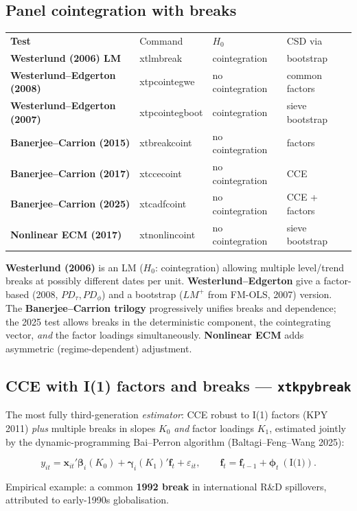 \documentclass[11pt,a4paper]{article}
\newcommand{\Ito}{I(1)}
\newcommand{\cmd}[1]{\texttt{\textcolor{camber}{#1}}}
\newcommand{\hlt}[2]{\textcolor{#1}{\textbf{#2}}}
\newcommand{\bbeta}{\boldsymbol{\beta}}
\newcommand{\bgamma}{\boldsymbol{\gamma}}
\newcommand{\bx}{\mathbf{x}}
\newcommand{\bff}{\mathbf{f}}
\newcommand{\bphi}{\boldsymbol{\phi}}
\theoremstyle{definition}
\begin{document}
\subsection{Panel cointegration with breaks}
\begin{center}
\begin{tabular}{@{}>{\bfseries}l >{\ttfamily}l l l@{}}
\rowcolor{cblue}\color{white}Test & \color{white}Command & \color{white}$H_0$ & \color{white}CSD via\\
Westerlund (2006) LM & xtlmbreak & cointegration & bootstrap\\
Westerlund--Edgerton (2008) & xtpcointegwe & no cointegration & common factors\\
Westerlund--Edgerton (2007) & xtpcointegboot & cointegration & sieve bootstrap\\
Banerjee--Carrion (2015) & xtbreakcoint & no cointegration & factors\\
Banerjee--Carrion (2017) & xtccecoint & no cointegration & CCE\\
Banerjee--Carrion (2025) & xtcadfcoint & no cointegration & CCE + factors\\
Nonlinear ECM (2017) & xtnonlincoint & no cointegration & sieve bootstrap\\
\end{tabular}
\end{center}
\textbf{Westerlund (2006)} is an LM ($H_0$: cointegration) allowing multiple level/trend breaks at
possibly different dates per unit. \textbf{Westerlund--Edgerton} give a factor-based (2008,
$PD_\tau,PD_\phi$) and a bootstrap ($LM^+$ from FM-OLS, 2007) version. The
\textbf{Banerjee--Carrion trilogy} progressively unifies breaks and dependence; the 2025 test allows
breaks in the deterministic component, the cointegrating vector, \emph{and} the factor loadings
simultaneously. \textbf{Nonlinear ECM} adds asymmetric (regime-dependent) adjustment.

\subsection{CCE with I(1) factors and breaks --- \cmd{xtkpybreak}}
The most fully third-generation \emph{estimator}: CCE robust to \Ito{} factors (KPY 2011) \emph{plus}
multiple breaks in slopes $K_0$ \emph{and} factor loadings $K_1$, estimated jointly by the
dynamic-programming Bai--Perron algorithm (Baltagi--Feng--Wang 2025):
\begin{eqbox}
\[
y_{it}=\bx_{it}'\bbeta_i(K_0)+\bgamma_i(K_1)'\bff_t+\varepsilon_{it},\qquad \bff_t=\bff_{t-1}+\bphi_t\ (\text{\Ito}).
\]
\end{eqbox}
Empirical example: a common \hlt{camber}{1992 break} in international R\&D spillovers, attributed to
early-1990s globalisation.
\end{document}
